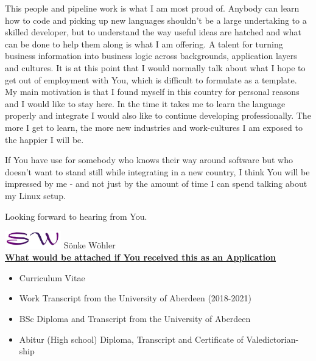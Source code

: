 \documentclass[paper=a4,fontsize=11pt]{scrartcl} %
\newcommand{\sepspace}{\vspace*{1em}}    %
\begin{document}
  \sepspace

  \noindent  This people and pipeline work is what I am most proud of.  Anybody
  can learn how to code and picking up new languages shouldn't be a large
  undertaking to a skilled developer, but to understand the way useful ideas
  are hatched and what can be done to help them along is what I am offering.  A
  talent for turning business information into business logic across
  backgrounds, application layers and cultures.  It is at this point that I
  would normally talk about what I hope to get out of employment with You,
  which is difficult to formulate as a template.  My main motivation is that I
  found myself in this country for personal reasons and I would like to stay
  here.  In the time it takes me to learn the language properly and integrate I
  would also like to continue developing professionally.  The more I get to
  learn, the more new industries and work-cultures I am exposed to the happier
  I will be.

  \sepspace
  
  \noindent  If You have use for somebody who knows their way around software
  but who doesn't want to stand still while integrating in a new country, I
  think You will be impressed by me - and not just by the amount of time I can
  spend talking about my Linux setup.

  \sepspace

  \sepspace

  \noindent
  Looking forward to hearing from You.

  \sepspace

  \includegraphics[height=0.78cm]{signature}\hspace{2.5cm}
  \hfill
  \MyDate
  \vspace{5pt}
  S\"onke W\"ohler  \\

  \vfill
  \footnotesize
  \textbf{\underline{What would be attached if You received this as an Application}}
  \begin{itemize}[noitemsep,topsep=0pt]
    \item Curriculum Vitae
    \item Work Transcript from the University of Aberdeen (2018-2021)
    \item BSc Diploma and Transcript from the University of Aberdeen
    \item Abitur (High school) Diploma, Transcript and Certificate of Valedictorian-ship
  \end{itemize}
\end{document}
